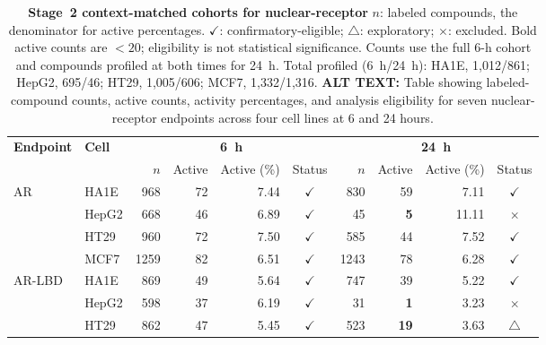 \documentclass[11pt,a4paper]{article}
\begin{document}
\begin{landscape}
\begingroup
\begin{table}[p]
\centering
\captionsetup{width=\linewidth,font=footnotesize}
\caption{\textbf{Stage~2 context-matched cohorts for nuclear-receptor}
\(n\): labeled compounds, the denominator for active percentages.
\(\checkmark\): confirmatory-eligible; \(\triangle\): exploratory;
\(\times\): excluded. Bold active counts are \(<20\); eligibility is not
statistical significance. Counts use the full 6-h cohort and compounds
profiled at both times for 24~h. Total profiled (6~h/24~h):
HA1E, 1,012/861; HepG2, 695/46; HT29, 1,005/606; MCF7, 1,332/1,316. \textbf{ALT TEXT:}
Table showing labeled-compound counts, active counts, activity percentages,
and analysis eligibility for seven nuclear-receptor endpoints across four
cell lines at 6 and 24 hours.}
\label{tab:nuclear-receptor-task-cell-counts}
\fontsize{10.2}{11.2}\selectfont
\setlength{\tabcolsep}{3.5pt}
\renewcommand{\arraystretch}{0.94}
\setlength{\aboverulesep}{1pt}
\setlength{\belowrulesep}{1pt}
\begin{tabular*}{\linewidth}{@{\extracolsep{\fill}}ll|rrrcrrrc@{}} %
\toprule
\multirow[c]{2}{*}{\textbf{Endpoint}} &
\multirow[c]{2}{*}{\textbf{Cell}} &
\multicolumn{4}{c}{\textbf{6~h}} &
\multicolumn{4}{c}{\textbf{24~h}} \\
\cmidrule(lr){3-6}\cmidrule(lr){7-10}
& & \(n\) & Active & Active (\%) & Status &
\(n\) & Active & Active (\%) & Status \\
\midrule
\multirow[c]{4}{*}{AR} & HA1E & 968 & 72 & 7.44 & \(\checkmark\) & 830 & 59 & 7.11 & \(\checkmark\) \\
 & HepG2 & 668 & 46 & 6.89 & \(\checkmark\) & 45 & \textbf{5} & 11.11 & \(\times\) \\
 & HT29 & 960 & 72 & 7.50 & \(\checkmark\) & 585 & 44 & 7.52 & \(\checkmark\) \\
 & MCF7 & 1259 & 82 & 6.51 & \(\checkmark\) & 1243 & 78 & 6.28 & \(\checkmark\) \\
\midrule
\multirow[c]{4}{*}{AR-LBD} & HA1E & 869 & 49 & 5.64 & \(\checkmark\) & 747 & 39 & 5.22 & \(\checkmark\) \\
 & HepG2 & 598 & 37 & 6.19 & \(\checkmark\) & 31 & \textbf{1} & 3.23 & \(\times\) \\
 & HT29 & 862 & 47 & 5.45 & \(\checkmark\) & 523 & \textbf{19} & 3.63 & \(\triangle\) \\

\end{tabular*}
\end{table}
\end{landscape}
\end{document}
